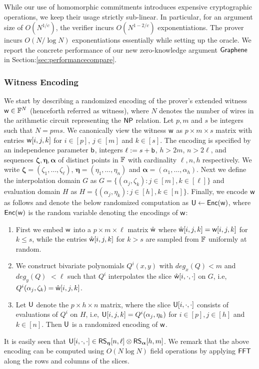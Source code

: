 While our use of homomorphic commitments introduces expensive cryptographic operations, we keep their usage strictly sub-linear. In particular, for an argument size of $O(N^{1/c})$, the verifier incurs $O(N^{1-2/c})$ exponentiations. The prover incurs $O(N/\log N)$ exponentiations essentially while setting up the oracle. We report the concrete performance of our new zero-knowledge argument $\textsf{Graphene}$ in Section:\ref{sec:performancecompare}.

\subsubsection{Witness Encoding}\label{subsec:witencoding}
We start by describing a randomized encoding of the prover's extended witness $\mathsf{w}\in \mathbb{F}^N$ (henceforth referred as witness), where $N$ denotes the number of wires in the arithmetic circuit representing the $\mathsf{NP}$ relation. Let $p,m$ and $s$ be integers such that $N=pms$. We canonically view the witness $\mathsf{w}$ as $p\times m\times s$ matrix with entries $\mathsf{w}[i,j,k]$ for $i\in [p]$, $j\in [m]$ and $k\in [s]$. The encoding is specified by an independence parameter $\mathsf{b}$, integers $\ell := s+\mathsf{b}$, $h>2m$, $n>2\ell$, and sequences $\bm{\zeta},\bm{\eta},\bm{\alpha}$ of distinct points in $\mathbb{F}$ with cardinality $\ell,n,h$ respectively. We write $\bm{\zeta}=(\zeta_1,\ldots,\zeta_\ell)$, $\bm{\eta}=(\eta_1,\ldots,\eta_n)$ and $\bm{\alpha}=(\alpha_1,\ldots,\alpha_h)$. 
Next we define the interpolation domain $G$ as $G=\{(\alpha_j,\zeta_k): j\in[m], k\in [\ell]\}$ and evaluation domain $H$ as $H=\{(\alpha_j,\eta_k): j\in [h],
k\in [n]\}$. Finally, we encode $\mathsf{w}$ as follows and denote the below randomized computation as $\mathsf{U}\leftarrow \mathsf{Enc}(\mathsf{w})$, where  $\mathsf{Enc}(\mathsf{w})$ is the random variable denoting the encodings of $\mathsf{w}$:
\begin{enumerate}[{\rm (i)}]
	\item First we embed $\mathsf{w}$ into a $p\times m\times \ell$ matrix $\hat{\mathsf{w}}$ where $\hat{\mathsf{w}}[i,j,k]=\mathsf{w}[i,j,k]$ for $k\leq s$, while the entries $\hat{\mathsf{w}}[i,j,k]$ for $k>s$ are sampled from $\mathbb{F}$ uniformly at random.
	\item We construct bivariate polynomials $Q^i(x,y)$ with $deg_x(Q)<m$ and $deg_y(Q) $ $<\ell$ such that $Q^i$ interpolates the slice $\hat{\mathsf{w}}[i,\cdot,\cdot]$ on $G$, i.e,
	$Q^i(\alpha_j,\zeta_k)=\hat{\mathsf{w}}[i,j,k]$.
	\item Let $\mathsf{U}$ denote the $p\times h\times n$ matrix, where the slice $\mathsf{U}[i,\cdot,\cdot]$ consists of evaluations of $Q^i$ on $H$, i.e, $\mathsf{U}[i,j,k]=Q^i(\alpha_j,\eta_k)$ for $i\in [p], j\in [h]$ and $k\in [n]$. Then $\mathsf{U}$ is a randomized encoding of $\mathsf{w}$.
\end{enumerate}
It is easily seen that $\mathsf{U}[i,\cdot,\cdot]\in \mathsf{RS}_{\bm{\eta}}[n,\ell]\otimes \mathsf{RS}_{\bm{\alpha}}[h,m]$. We remark that the above encoding can be computed using $O(N\log N)$ field operations by applying $\mathsf{FFT}$ along the rows and columns of the slices.

